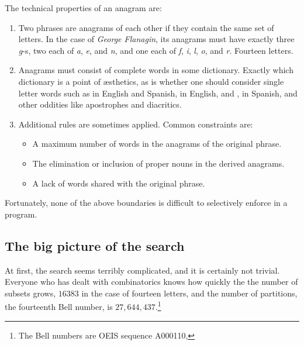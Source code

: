 \documentclass[letterpaper, 11pt]{article}
\begin{document}
The technical properties of an anagram are:

\begin{enumerate}
\item Two phrases are anagrams of each other if they contain the
same set of letters. In the case of \emph{George Flanagin}, its
anagrams must have exactly three \emph{g}-s, two each of \emph{a},
\emph{e}, and \emph{n}, and one each of \emph{f}, \emph{i}, \emph{l},
\emph{o}, and \emph{r}.  Fourteen letters.

\item Anagrams must consist of complete words in some dictionary.
Exactly which dictionary is a point of {\ae}sthetics, as is whether
one should consider single letter words such as  in English
and Spanish,  in English, and ,  in Spanish,
and other oddities like apostrophes and diacritics.

\item Additional rules are sometimes applied. Common constraints are:

\begin{itemize}
\item A maximum number of words in the anagrams of the original phrase.

\item The elimination or inclusion of proper nouns in the derived
anagrams.

\item A lack of words shared with the original phrase.
\end{itemize}
\end{enumerate}

Fortunately, none of the above boundaries is difficult to selectively
enforce in a program. 

\subsection{The big picture of the search}

At first, the search seems terribly complicated, and it is certainly
not trivial. Everyone who has dealt with combinatorics knows how
quickly the the number of subsets grows, $16383$ in the case of
fourteen letters, and the number of partitions, the fourteenth Bell
number, is $27,644,437$.\footnote{The Bell numbers are OEIS sequence
A000110, }
\end{document}
